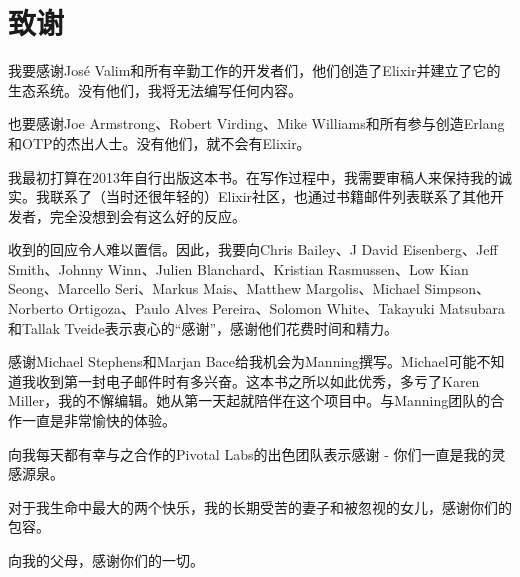 \chapter*{致谢}\label{acknowledgement}

我要感谢José
Valim和所有辛勤工作的开发者们，他们创造了Elixir并建立了它的生态系统。没有他们，我将无法编写任何内容。

也要感谢Joe Armstrong、Robert Virding、Mike
Williams和所有参与创造Erlang和OTP的杰出人士。没有他们，就不会有Elixir。

我最初打算在2013年自行出版这本书。在写作过程中，我需要审稿人来保持我的诚实。我联系了（当时还很年轻的）Elixir社区，也通过书籍邮件列表联系了其他开发者，完全没想到会有这么好的反应。

收到的回应令人难以置信。因此，我要向Chris Bailey、J David
Eisenberg、Jeff Smith、Johnny Winn、Julien Blanchard、Kristian
Rasmussen、Low Kian Seong、Marcello Seri、Markus Mais、Matthew
Margolis、Michael Simpson、Norberto Ortigoza、Paulo Alves
Pereira、Solomon White、Takayuki Matsubara和Tallak
Tveide表示衷心的``感谢''，感谢他们花费时间和精力。

感谢Michael Stephens和Marjan
Bace给我机会为Manning撰写。Michael可能不知道我收到第一封电子邮件时有多兴奋。这本书之所以如此优秀，多亏了Karen
Miller，我的不懈编辑。她从第一天起就陪伴在这个项目中。与Manning团队的合作一直是非常愉快的体验。

向我每天都有幸与之合作的Pivotal Labs的出色团队表示感谢 - 你们一直是我的灵感源泉。

对于我生命中最大的两个快乐，我的长期受苦的妻子和被忽视的女儿，感谢你们的包容。

向我的父母，感谢你们的一切。
